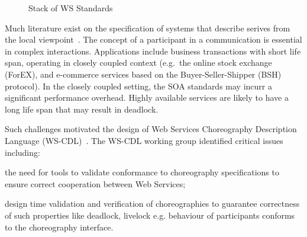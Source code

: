 \documentclass{llncs}
\begin{document}
		\begin{figure}[ht]
		\begin{centering}
		\caption{Stack of WS Standards}
		\label{fig:soa-stack}
		\end{centering}
		\end{figure}

Much literature exist on the specification of systems that describe serives from the local viewpoint~\cite{cs-processes,alg-seq-processes}.
The concept of a participant in a communication is essential in complex interactions. Applications include business transactions with short life span, operating in closely coupled context (e.g.\ the online stock exchange (ForEX), and e-commerce services based on the Buyer-Seller-Shipper (BSH) protocol). In the closely coupled setting, the SOA standards may incurr a significant performance overhead.
Highly available services are likely to have a long life span that may result in deadlock.

Such challenges motivated the design of Web Services Choreography Description Language (WS-CDL)~\cite{session-types-sessions}. The WS-CDL working group identified critical issues~\cite{ws-critical-overview} including:
\begin{compactenum}
	\item the need for tools to validate conformance to choreography specifications to ensure correct cooperation between Web Services;
	\item design time validation and verification of choreographies to guarantee correctness of such properties like deadlock, livelock e.g. behaviour of participants conforms to the choreography interface.
\end{compactenum}
\end{document}
